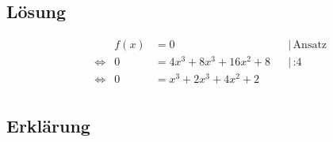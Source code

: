 \subsection*{Lösung}
\begin{align*}
     &                 & f(x) & = 0                 &  & |\,\text{Ansatz} \\
     & \Leftrightarrow & 0    & = 4x^3+8x^3+16x^2+8 &  & |\,\text{:4}     \\
     & \Leftrightarrow & 0    & = x^3+2x^3+4x^2+2   &  &                  \\
\end{align*}

\subsection*{Erklärung}


